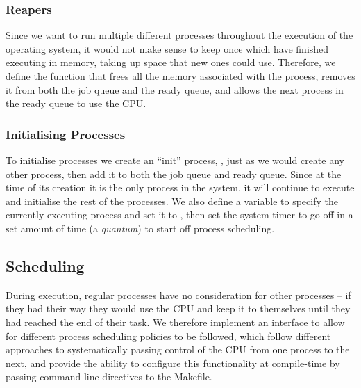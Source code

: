     \subsubsection{Reapers}
        \label{sec:cleanup}
        Since we want to run multiple different processes throughout the
        execution of the operating system, it would not make sense to keep once
        which have finished executing in memory, taking up space that new ones
        could use. Therefore, we define the  function that frees
        all the memory associated with the process, removes it from both the job
        queue and the ready queue, and allows the next process in the ready
        queue to use the CPU.

    \subsubsection{Initialising Processes}
        To initialise processes we create an ``init'' process, , just
        as we would create any other process, then add it to both the job queue
        and ready queue. Since at the time of its creation it is the only
        process in the system, it will continue to execute and initialise the
        rest of the processes. We also define a variable to specify the
        currently executing process and set it to , then set the
        system timer to go off in a set amount of time (a \textit{quantum}) to
        start off process scheduling.

\subsection{Scheduling}
    During execution, regular processes have no consideration for other
    processes -- if they had their way they would use the CPU and keep it to
    themselves until they had reached the end of their task. We therefore
    implement an interface to allow for different process scheduling policies to
    be followed, which follow different approaches to systematically passing
    control of the CPU from one process to the next, and provide the ability to
    configure this functionality at compile-time by passing command-line
    directives to the Makefile.

